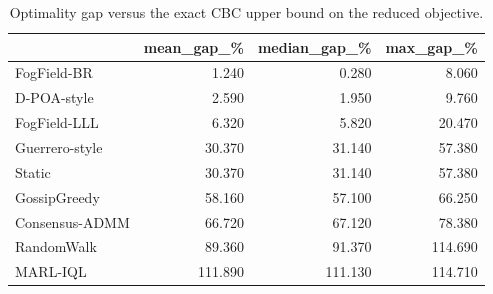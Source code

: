 \begin{table}
\caption{Optimality gap versus the exact CBC upper bound on the reduced objective.}
\label{tab:table2_optimality_gap}
\begin{tabular}{lrrr}
\toprule
 & mean\_gap\_\% & median\_gap\_\% & max\_gap\_\% \\
\midrule
FogField-BR & 1.240 & 0.280 & 8.060 \\
D-POA-style & 2.590 & 1.950 & 9.760 \\
FogField-LLL & 6.320 & 5.820 & 20.470 \\
Guerrero-style & 30.370 & 31.140 & 57.380 \\
Static & 30.370 & 31.140 & 57.380 \\
GossipGreedy & 58.160 & 57.100 & 66.250 \\
Consensus-ADMM & 66.720 & 67.120 & 78.380 \\
RandomWalk & 89.360 & 91.370 & 114.690 \\
MARL-IQL & 111.890 & 111.130 & 114.710 \\
\bottomrule
\end{tabular}
\end{table}
